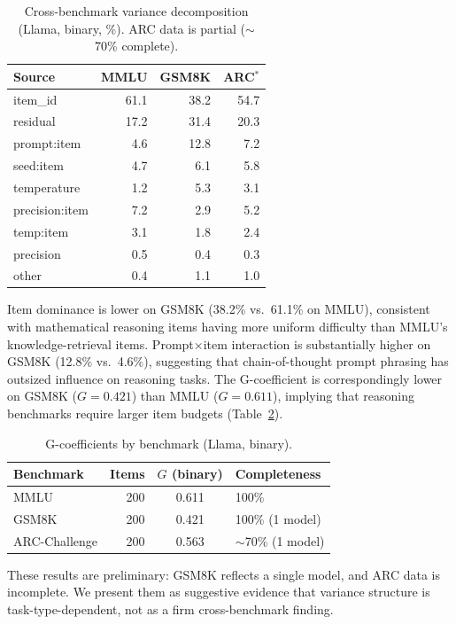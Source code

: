 \documentclass[letterpaper]{article}
\begin{document}
\begin{table}[t]
\centering
\caption{Cross-benchmark variance decomposition (Llama, binary, \%). ARC data is partial ($\sim$70\% complete).}
\label{tab:crossbench}
\small
\begin{tabular}{lrrr}
\toprule
Source & MMLU & GSM8K & ARC$^*$ \\
\midrule
item\_id & 61.1 & 38.2 & 54.7 \\
residual & 17.2 & 31.4 & 20.3 \\
prompt:item & 4.6 & 12.8 & 7.2 \\
seed:item & 4.7 & 6.1 & 5.8 \\
temperature & 1.2 & 5.3 & 3.1 \\
precision:item & 7.2 & 2.9 & 5.2 \\
temp:item & 3.1 & 1.8 & 2.4 \\
precision & 0.5 & 0.4 & 0.3 \\
other & 0.4 & 1.1 & 1.0 \\
\bottomrule
\end{tabular}
\end{table}

Item dominance is lower on GSM8K (38.2\% vs.\ 61.1\% on MMLU), consistent with mathematical reasoning items having more uniform difficulty than MMLU's knowledge-retrieval items. Prompt$\times$item interaction is substantially higher on GSM8K (12.8\% vs.\ 4.6\%), suggesting that chain-of-thought prompt phrasing has outsized influence on reasoning tasks. The G-coefficient is correspondingly lower on GSM8K ($G = 0.421$) than MMLU ($G = 0.611$), implying that reasoning benchmarks require larger item budgets (Table~\ref{tab:gbench}).

\begin{table}[t]
\centering
\caption{G-coefficients by benchmark (Llama, binary).}
\label{tab:gbench}
\small
\begin{tabular}{lrcl}
\toprule
Benchmark & Items & $G$ (binary) & Completeness \\
\midrule
MMLU & 200 & 0.611 & 100\% \\
GSM8K & 200 & 0.421 & 100\% (1 model) \\
ARC-Challenge & 200 & 0.563 & $\sim$70\% (1 model) \\
\bottomrule
\end{tabular}
\end{table}

These results are preliminary: GSM8K reflects a single model, and ARC data is incomplete. We present them as suggestive evidence that variance structure is task-type-dependent, not as a firm cross-benchmark finding.
\end{document}
